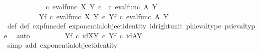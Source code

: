 \begin{isabellebody}
\ \ \isamarkupfalse%
\ {\isacharminus}{\kern0pt}\ \isanewline
\ \ \ \ \isamarkupfalse%
\ {\isachardoublequoteopen}{\isacharparenleft}{\kern0pt}{\isasymphi}\ {\isasymcirc}\isactrlsub c\ eval{\isacharunderscore}{\kern0pt}func\ X\ Y{\isacharparenright}{\kern0pt}\isactrlsup {\isasymsharp}\ {\isasymcirc}\isactrlsub c\ {\isacharparenleft}{\kern0pt}{\isasympsi}\ {\isasymcirc}\isactrlsub c\ eval{\isacharunderscore}{\kern0pt}func\ A\ Y{\isacharparenright}{\kern0pt}\isactrlsup {\isasymsharp}\ {\isacharequal}{\kern0pt}\ \isanewline
\ \ \ \ \ \ \ \ \ \ {\isacharparenleft}{\kern0pt}{\isasymphi}\isactrlbsup Y\isactrlesup \isactrlsub f\ {\isasymcirc}\isactrlsub c\ {\isacharparenleft}{\kern0pt}eval{\isacharunderscore}{\kern0pt}func\ X\ Y{\isacharparenright}{\kern0pt}\isactrlsup {\isasymsharp}{\isacharparenright}{\kern0pt}\ {\isasymcirc}\isactrlsub c\ {\isacharparenleft}{\kern0pt}{\isasympsi}\isactrlbsup Y\isactrlesup \isactrlsub f\ {\isasymcirc}\isactrlsub c\ {\isacharparenleft}{\kern0pt}eval{\isacharunderscore}{\kern0pt}func\ A\ Y{\isacharparenright}{\kern0pt}\isactrlsup {\isasymsharp}{\isacharparenright}{\kern0pt}{\isachardoublequoteclose}\isanewline
\ \ \ \ \ \ \isamarkupfalse%
\ {\isasymphi}{\isacharunderscore}{\kern0pt}def\ {\isasympsi}{\isacharunderscore}{\kern0pt}def\ exp{\isacharunderscore}{\kern0pt}func{\isacharunderscore}{\kern0pt}def{}\ exponential{\isacharunderscore}{\kern0pt}object{\isacharunderscore}{\kern0pt}identity\ id{\isacharunderscore}{\kern0pt}right{\isacharunderscore}{\kern0pt}unit{}\ phi{\isacharunderscore}{\kern0pt}eval{\isacharunderscore}{\kern0pt}type\ psi{\isacharunderscore}{\kern0pt}eval{\isacharunderscore}{\kern0pt}type\ \isamarkupfalse%
\ auto\isanewline
\ \ \ \ \isamarkupfalse%
\ \isamarkupfalse%
\ {\isachardoublequoteopen}{\isachardot}{\kern0pt}{\isachardot}{\kern0pt}{\isachardot}{\kern0pt}\ {\isacharequal}{\kern0pt}\ {\isacharparenleft}{\kern0pt}{\isasymphi}\isactrlbsup Y\isactrlesup \isactrlsub f\ {\isasymcirc}\isactrlsub c\ id{\isacharparenleft}{\kern0pt}X\isactrlbsup Y\isactrlesup {\isacharparenright}{\kern0pt}{\isacharparenright}{\kern0pt}\ {\isasymcirc}\isactrlsub c\ {\isacharparenleft}{\kern0pt}{\isasympsi}\isactrlbsup Y\isactrlesup \isactrlsub f\ {\isasymcirc}\isactrlsub c\ id{\isacharparenleft}{\kern0pt}A\isactrlbsup Y\isactrlesup {\isacharparenright}{\kern0pt}{\isacharparenright}{\kern0pt}{\isachardoublequoteclose}\isanewline
\ \ \ \ \ \ \isamarkupfalse%
\ {\isacharparenleft}{\kern0pt}simp\ add{\isacharcolon}{\kern0pt}\ exponential{\isacharunderscore}{\kern0pt}object{\isacharunderscore}{\kern0pt}identity{\isacharparenright}{\kern0pt}\isanewline

\end{isabellebody}
